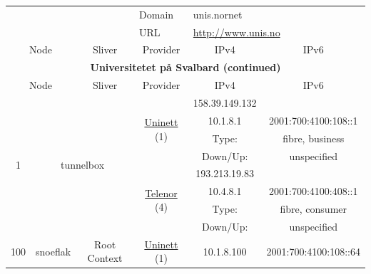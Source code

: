 \begin{small}
\begin{center}
\begin{longtable}{|c|c|c|c|c|c|c|c|}
 \multicolumn{4}{|c|}{} & \multicolumn{1}{|l|}{Domain} & \multicolumn{3}{|l|}{\index{unis.nornet}unis.nornet} \\* \cline{5-5}\cline{6-6}\cline{7-7}\cline{8-8}
 \multicolumn{4}{|c|}{} & \multicolumn{1}{|l|}{URL} & \multicolumn{3}{|l|}{\url{http://www.unis.no}} \\ \hline
 \multicolumn{2}{|p{8em}|}{Node} & \multicolumn{2}{|p{8em}|}{Sliver} & \multicolumn{2}{|p{8em}|}{Provider} & IPv4 & IPv6 \\ \hline
\endfirsthead
\hline
 \multicolumn{8}{|c|}{\textbf{Universitetet på Svalbard (continued)}} \\ \hline
 \multicolumn{2}{|p{8em}|}{Node} & \multicolumn{2}{|p{8em}|}{Sliver} & \multicolumn{2}{|p{8em}|}{Provider} & IPv4 & IPv6 \\ \hline
\endhead
 \multirow{8}{*}{\tiny{1}} & \multicolumn{3}{|c|}{\multirow{8}{*}{\tiny{tunnelbox}}} & \multicolumn{2}{|c|}{\multirow{4}{*}{\tiny{\href{https://www.uninett.no}{Uninett} (1)}}} & \tiny{158.39.149.132} & \frownie{} \\* \cline{7-7}\cline{8-8}
  & \multicolumn{3}{|c|}{} & \multicolumn{2}{|c|}{} & \tiny{10.1.8.1} & \tiny{2001:700:4100:108::1} \\* \cline{7-7}\cline{8-8}
  & \multicolumn{3}{|c|}{} & \multicolumn{2}{|c|}{} & Type: & fibre, business \\* \cline{7-7}\cline{8-8}
  & \multicolumn{3}{|c|}{} & \multicolumn{2}{|c|}{} & Down/Up:  & unspecified \\* \cline{5-5}\cline{6-6}\cline{7-7}\cline{8-8}
  & \multicolumn{3}{|c|}{} & \multicolumn{2}{|c|}{\multirow{4}{*}{\tiny{\href{https://www.telenor.no}{Telenor} (4)}}} & \tiny{193.213.19.83} & \frownie{} \\* \cline{7-7}\cline{8-8}
  & \multicolumn{3}{|c|}{} & \multicolumn{2}{|c|}{} & \tiny{10.4.8.1} & \tiny{2001:700:4100:408::1} \\* \cline{7-7}\cline{8-8}
  & \multicolumn{3}{|c|}{} & \multicolumn{2}{|c|}{} & Type: & fibre, consumer \\* \cline{7-7}\cline{8-8}
  & \multicolumn{3}{|c|}{} & \multicolumn{2}{|c|}{} & Down/Up:  & unspecified \\ \hline
 \multirow{16}{*}{\tiny{100}} & \multicolumn{1}{|l|}{\multirow{16}{*}{\tiny{snoeflak}}} & \multicolumn{2}{|c|}{\multirow{2}{*}{\tiny{Root Context}}} & \multicolumn{2}{|c|}{\tiny{\href{https://www.uninett.no}{Uninett} (1)}} & \tiny{10.1.8.100} & \tiny{2001:700:4100:108::64} \\* \cline{5-5}\cline{6-6}\cline{7-7}\cline{8-8}

\end{longtable}
\end{center}
\end{small}
